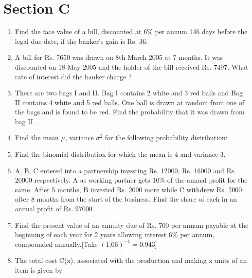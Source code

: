 \documentclass[journal,12pt,twocolumn]{IEEEtran}
\renewcommand\thesection{\arabic{section}}
\begin{document}
\section{Section C}
\renewcommand{\theequation}{\theenumi}
\begin{enumerate}[label=\thesection.\arabic*.,ref=\thesection.\theenumi]
\item Find the face value of a bill, discounted at 6\% per annum 146 days before the legal due date, if the banker's gain is Rs. 36.
\item A bill for Rs. 7650 was drawn on 8th March 2005 at 7 months. It was discounted on 18 May 2005 and the holder of the bill received Rs. 7497. What rate of interest did the banker charge ?
\item There are two bags I and II. Bag I contains 2 white and 3 red balls and Bag II contains 4 white and 5 red balls. One ball is drawn at random from one of the bags and is found to be red. Find the probability that it was drawn from bag II.
\item Find the mean $\mu$, variance $\sigma^2$ for the following probability distribution:
\begin{table}[htb]
 \tiny
 \caption{}
 \end{table}
\item Find the binomial distribution for which the mean is 4 and variance 3.
\item A, B, C entered into a partnership investing Rs. 12000, Rs. 16000 and
Rs. 20000 respectively. A as working partner gets 10\% of the annual profit for
the same. After 5 months, B invested Rs. 2000 more while C withdrew Rs. 2000
after 8 months from the start of the business. Find the share of each in an
annual profit of Rs. 97000.
\item Find the present value of an annuity due of Rs. 700 per annum payable at the
beginning of each year for 2 years allowing interest 6\% per annum, compounded
annually.[Take $(1.06)^{-1} = 0.943$]
\item The total cost C(x), associated with the production and making x units of an item is given by
\begin{align}

\end{align}
\end{enumerate}
\end{document}
